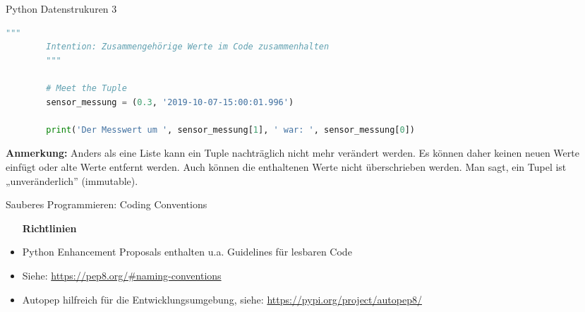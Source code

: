 \begin{frame}[fragile]{Python Datenstrukuren 3}
    \begin{lstlisting}[language=Python, gobble=8]
        """
        Intention: Zusammengehörige Werte im Code zusammenhalten
        """

        # Meet the Tuple
        sensor_messung = (0.3, '2019-10-07-15:00:01.996')

        print('Der Messwert um ', sensor_messung[1], ' war: ', sensor_messung[0])
    \end{lstlisting}

    \bigskip
    \bigskip

    \parbox{\linewidth}{
        \textbf{Anmerkung:} Anders als eine Liste kann ein Tuple nachträglich nicht mehr
        verändert werden. Es können daher keinen neuen Werte einfügt oder alte
        Werte entfernt werden. Auch können die enthaltenen Werte nicht überschrieben
        werden. Man sagt, ein Tupel ist „unveränderlich” (immutable).
    }
\end{frame}

\begin{frame}[fragile]{Sauberes Programmieren: Coding Conventions}
    \begin{itemize}
    \setlength{\itemindent}{.5in}
     \item [\textbf{ Richtlinien}]
    \end{itemize}
    \begin{itemize}
        \item Python Enhancement Proposals enthalten u.a. Guidelines für lesbaren Code
        \item Siehe: \url{https://pep8.org/#naming-conventions}
        \item Autopep hilfreich für die Entwicklungsumgebung, siehe:  \url{https://pypi.org/project/autopep8/}
     \end{itemize}
\end{frame}

